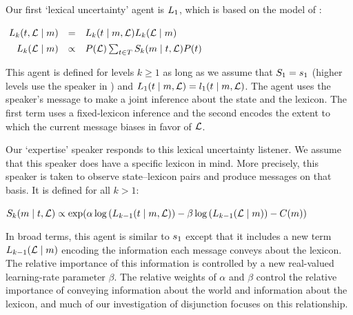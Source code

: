 \documentclass{article}
\begin{document}
Our first `lexical uncertainty' agent is $\ListenerK[1]$, which is based
on the model of \citet{Smith:Goodman:Frank:2013}:
%
\begin{examples}
  \item\label{L1}%
    \setlength{\arraycolsep}{2pt}%
    $\mspace{-4mu}\begin{array}[t]{r c l}
      \ListenerK(\state, \Lex \given \msg) 
      &=&
      \ListenerK(\state \given \msg, \Lex) \ListenerK(\Lex \given \msg) 
      \\[1ex]
      \ListenerK(\Lex \given \msg) 
      &\propto& 
      \Prior(\Lex) \sum_{\state\in\States} \SpeakerK(\msg \given \state, \Lex)\Prior(\state)
    \end{array}$
\end{examples}
%
This agent is defined for levels $k \geqslant 1$ as long as we assume
that $\SpeakerK[1] = \speakerOne$ (higher levels use the speaker in
) and
$\ListenerK[1](\state \given \msg, \Lex) = \listenerOne(\state
\given \msg, \Lex)$.
The agent uses the speaker's message to make a joint inference about
the state and the lexicon. The first term uses a fixed-lexicon
inference and the second encodes the extent to which the current
message biases in favor of $\Lex$.

Our `expertise' speaker responds to this lexical uncertainty listener.
We assume that this speaker does have a specific lexicon in mind.  More
precisely, this speaker is taken to observe state--lexicon pairs and
produce messages on that basis. It is defined for all $k > 1$:

\begin{examples}  
  \item\label{Sk}%
    $\SpeakerK(\msg \given \state, \Lex) \propto 
    \exp\negthinspace%
    \left(
      \alpha\log\left(\ListenerK[k-1](\state \given \msg, \Lex)\right)
      - 
      \beta\log\left(\ListenerK[k-1](\Lex\given\msg)\right)
      -
      \Costs(\msg)
    \right)$
\end{examples}
%
In broad terms, this agent is similar to $\speakerOne$ except that it
includes a new term $\ListenerK[k-1](\Lex\given\msg)$ encoding the
information each message conveys about the lexicon. The relative
importance of this information is controlled by a new real-valued
learning-rate parameter $\beta$. The relative weights of $\alpha$ and
$\beta$ control the relative importance of conveying information about
the world and information about the lexicon, and much of our
investigation of disjunction focuses on this relationship.
\end{document}
